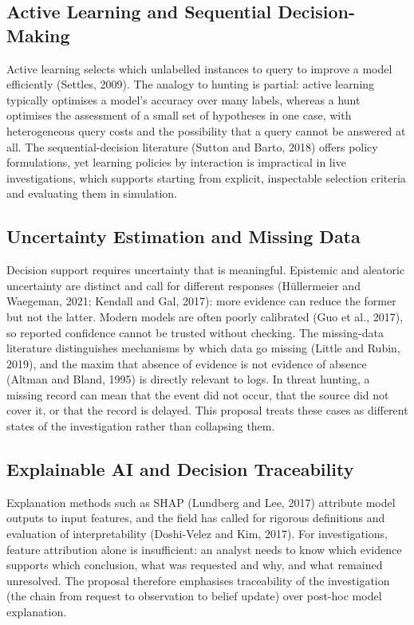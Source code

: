 \documentclass[a4paper,11pt,oneside]{article}
\begin{document}
\subsection{Active Learning and Sequential Decision-Making}
Active learning selects which unlabelled instances to query to improve a model efficiently (Settles, 2009). The analogy to hunting is partial: active learning typically optimises a model’s accuracy over many labels, whereas a hunt optimises the assessment of a small set of hypotheses in one case, with heterogeneous query costs and the possibility that a query cannot be answered at all. The sequential-decision literature (Sutton and Barto, 2018) offers policy formulations, yet learning policies by interaction is impractical in live investigations, which supports starting from explicit, inspectable selection criteria and evaluating them in simulation.
\subsection{Uncertainty Estimation and Missing Data}
Decision support requires uncertainty that is meaningful. Epistemic and aleatoric uncertainty are distinct and call for different responses (Hüllermeier and Waegeman, 2021; Kendall and Gal, 2017): more evidence can reduce the former but not the latter. Modern models are often poorly calibrated (Guo et al., 2017), so reported confidence cannot be trusted without checking. The missing-data literature distinguishes mechanisms by which data go missing (Little and Rubin, 2019), and the maxim that absence of evidence is not evidence of absence (Altman and Bland, 1995) is directly relevant to logs. In threat hunting, a missing record can mean that the event did not occur, that the source did not cover it, or that the record is delayed. This proposal treats these cases as different states of the investigation rather than collapsing them.
\subsection{Explainable AI and Decision Traceability}
Explanation methods such as SHAP (Lundberg and Lee, 2017) attribute model outputs to input features, and the field has called for rigorous definitions and evaluation of interpretability (Doshi-Velez and Kim, 2017). For investigations, feature attribution alone is insufficient: an analyst needs to know which evidence supports which conclusion, what was requested and why, and what remained unresolved. The proposal therefore emphasises traceability of the investigation (the chain from request to observation to belief update) over post-hoc model explanation.
\end{document}
